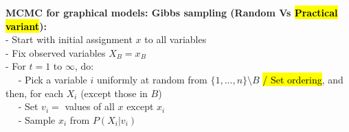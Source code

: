 \textbf{MCMC for graphical models: Gibbs sampling (Random Vs \hl{Practical variant}):}\\
- Start with initial assignment $x$ to all variables\\
- Fix observed variables $X_B=x_B$\\
- For $t=1$ to $\infty$, do:\\
$\quad$ - Pick a variable $i$ uniformly at random from $\{1,...,n\}\setminus B$ \hl{/ Set ordering}, and then, for each $X_i$ (except those in $B$)\\
$\quad$ - Set $v_i=$ values of all $x$ except $x_i$\\
$\quad$ - Sample $x_i$ from $P(X_i|v_i)$





